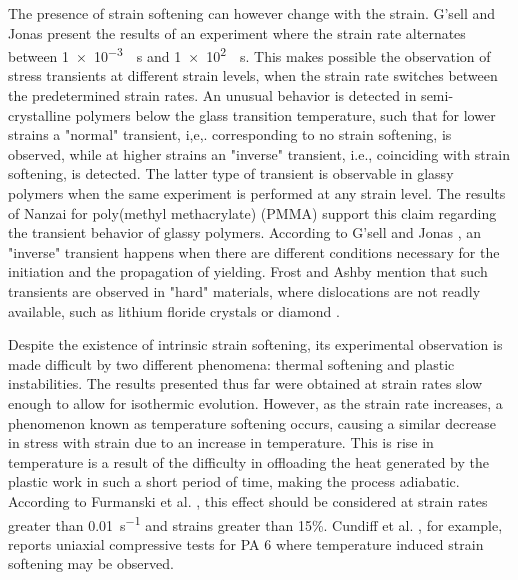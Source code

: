 The presence of strain softening can however change with the strain.
G'sell and Jonas \citep{gsellYieldTransientEffects1981} present the results of an experiment where the strain rate alternates between \SI{1e-3}{\per\second} and \SI{1e2}{\per \second}.
This makes possible the observation of stress transients at different strain levels, when the strain rate switches between the predetermined strain rates.
An unusual behavior is detected in semi-crystalline polymers below the glass transition temperature, such that for lower strains a "normal" transient, i,e,. corresponding to no strain softening, is observed, while at higher strains an "inverse" transient, i.e., coinciding with strain softening, is detected.
The latter type of transient is observable in glassy polymers when the same experiment is performed at any strain level.
The results of Nanzai \citep{nanzaiTransitionMechanismElastic1990} for poly(methyl methacrylate) (PMMA) support this claim regarding the transient behavior of glassy polymers.
According to G'sell and Jonas \citep{gsellDeterminationPlasticBehaviour1979}, an "inverse" transient happens when there are different conditions necessary for the initiation and the propagation of yielding.
Frost and Ashby \citep{frostDeformationmechanismMapsPlasticity1982} mention that such transients are observed in "hard" materials, where dislocations are not readly available, such as lithium floride crystals \citep{gilmanDislocationSourcesCrystals1959, johnstonYieldPointsDelay1962} or diamond \citep{alexanderDislocationsPlasticFlow1969}.

Despite the existence of intrinsic strain softening, its experimental observation is made difficult by two different phenomena: thermal softening and plastic instabilities.
The results presented thus far were obtained at strain rates slow enough to allow for isothermic evolution.
However, as the strain rate increases, a phenomenon known as temperature softening occurs, causing a similar decrease in stress with strain due to an increase in temperature.
This is rise in temperature is a result of the difficulty in offloading the heat generated by the plastic work in such a short period of time, making the process adiabatic.
According to Furmanski et al. \citep{furmanskiTimeTemperatureEquivalence2013}, this effect should be considered at strain rates greater than \SI{0.01}{s^{-1}} and strains greater than 15\%.
Cundiff et al. \citep{cundiffModelingViscoplasticBehavior2022}, for example, reports uniaxial compressive tests for PA 6 where temperature induced strain softening may be observed.


